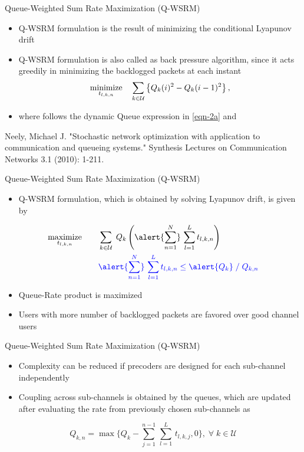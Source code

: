 \documentclass[9pt]{beamer}
\begin{document}
\begin{frame}{Queue-Weighted Sum Rate Maximization (\acs{Q-WSRM})}
\begin{itemize}
\item \acs{Q-WSRM} formulation is the result of minimizing the conditional Lyapunov drift\eqn{^\dagger}
\item \acs{Q-WSRM} formulation is also called as back pressure algorithm, since it acts greedily in minimizing the backlogged packets at each instant
\[ \underset{t_{l,k,n}}{\text{minimize}} \quad \sum_{k \in \mathcal{U}} \left \lbrace Q_k(i)^2 - Q_k(i-1)^2 \right \rbrace, \]
\item where  follows the dynamic Queue expression in \eqref{eqn-2a} and 
\end{itemize}

\vspace{2eM}
\eqn{^\dagger}\footnotesize{Neely, Michael J. "Stochastic network optimization with application to communication and queueing systems." Synthesis Lectures on Communication Networks 3.1 (2010): 1-211.}
\end{frame}

\begin{frame}{Queue-Weighted Sum Rate Maximization (\acs{Q-WSRM})}
\begin{itemize}
\item \acs{Q-WSRM} formulation, which is obtained by solving Lyapunov drift, is given by
\end{itemize}
\begin{subequations}
\begin{align}
 \underset{t_{l,k,n}}{\text{maximize}} & \qquad \sum_{k \in \mc{U}} \; Q_k \left ( \alert{\sum_{n=1}^N} \, \sum_{l = 1}^L  t_{l,k,n} \right ) \\
& \qquad {\color{blue} \alert{\sum_{n=1}^N} \, \sum_{l = 1}^L  t_{l,k,n}  \leq \alert{Q_k} \; / \; Q_{k,n}}
\end{align}
\end{subequations}
\begin{itemize}
\item Queue-Rate product is maximized
\item Users with more number of backlogged packets are favored over good channel users
\end{itemize}
\end{frame}

\begin{frame}{Queue-Weighted Sum Rate Maximization (\acs{Q-WSRM})}
	\begin{itemize}
		\item Complexity can be reduced if precoders are designed for each sub-channel independently
		\item Coupling across sub-channels is obtained by the queues, which are updated after evaluating the rate from previously chosen sub-channels as
	\end{itemize}
	\begin{equation*}
	Q_{k,n} = \max{\Big \lbrace Q_k - \sum_{j = 1}^{n-1} \, \sum_{l = 1}^{L} \, t_{l,k,j} ,0 \Big \rbrace }, \; \forall \; k \in \mathcal{U}
	\end{equation*}
\end{frame}
\end{document}
